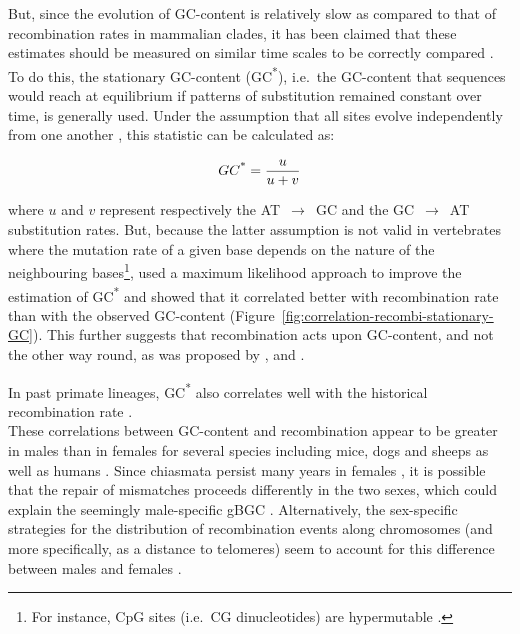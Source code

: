 But, since the evolution of GC-content is relatively slow as compared to that of recombination rates in mammalian clades, it has been claimed that these estimates should be measured on similar time scales to be correctly compared \citep{duret2009biased}.
To do this, the stationary GC-content (GC\textsuperscript{*}), i.e.\ the GC-content that sequences would reach at equilibrium if patterns of substitution remained constant over time, is generally used.
Under the assumption that all sites evolve independently from one another \citep{sueoka1962genetic}, this statistic can be calculated as:

\begin{equation*}
	GC\textsuperscript{*} = \frac{u}{u+v}
\end{equation*}

where $u$ and $v$ represent respectively the AT~$\rightarrow$~GC and the GC~$\rightarrow$~AT substitution rates.
But, because the latter assumption is not valid in vertebrates where the mutation rate of a given base depends on the nature of the neighbouring bases\footnote{For instance, CpG sites (i.e.\ CG dinucleotides) are hypermutable \citep{arndt2003distinct}.}, \citet{duret2008impact} used a maximum likelihood approach to improve the estimation of GC\textsuperscript{*} and showed that it correlated better with recombination rate than with the observed GC-content (Figure~\ref{fig:correlation-recombi-stationary-GC}). This further suggests that recombination acts upon GC-content, and not the other way round, as was proposed by \citet{gerton2000global}, \citet{blat2002physical} and \citet{petes2002context}.

In past primate lineages, GC\textsuperscript{*} also correlates well with the historical recombination rate \citep{munch2014finescale}.\\



These correlations between GC-content and recombination appear to be greater in males than in females for several species including mice, dogs and sheeps \citep{popa2012sexspecific} as well as humans \citep{webster2005maledriven, dreszer2007biased, duret2008impact}.
Since chiasmata persist many years in females \citep{coop2007evolutionary}, it is possible that the repair of mismatches proceeds differently in the two sexes, which could explain the seemingly male-specific gBGC \citep{duret2009biased}.
Alternatively, the sex-specific strategies for the distribution of recombination events along chromosomes (and more specifically, as a distance to telomeres) seem to account for this difference between males and females \citep{popa2012sexspecific}.


